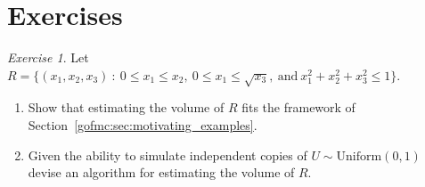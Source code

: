 \documentclass[12pt]{article}
\theoremstyle{plain}
\theoremstyle{definition}
\theoremstyle{remark}
\newtheorem{hw}{Exercise}[section]
\begin{document}
\begin{comment}

The volume of the confidence ellipsoid is given by
$$
\frac{2 \pi^{p/2} k^p}{p \Gamma(p)} \left[ \frac{\det(S)}{m}
\right]^{1/2}\; . 
$$
Then $\det{S}$ is the \textit{generalized variance} of the Monte Carlo
error. While $\det(S)$ is a useful univariate summary it can give an
incomplete picture of the nature of Monte Carlo error.  Recall that
$\det(S)=\lambda_1 \cdots \lambda_p$ so a small generalized variance
can be achieved with one tiny eigenvalue. Thus examination of the
sample eigenvalues is advised in applications.


\subsubsection{Multivariate Stopping Rules}
\label{gofmc:sec:mstop}
The obvious extension of the univariate approach to controlling the width
of a confidence interval is to control the volume of the confidence
ellipsoid which, letting $\det$ denote determinant, is given by
$$
\frac{2 \pi^{p/2} k^p}{p \Gamma(p)} \det(S)^{1/2}\; .
$$
We call $\det{S}$ the \textit{generalized variance} of the Monte Carlo
error. While $\det(S)$ is a useful univariate summary it can give an incomplete
picture of the nature of Monte Carlo error.   Recall that
$\det(S)=\lambda_1  \cdots \lambda_p$ so a small generalized variance
can be achieved with one tiny eigenvalue. Thus examination of the
sample eigenvalues is advised in applications.

Other useful approaches include standardization to adjust for the
marginal variation in the simulation and for the number of quantities
being estimated.  These options are explored in the exercises.
\end{comment}



\section*{Exercises}
\begin{hw}
Let $R = \{(x_1, x_2, x_3) ~:~ 0\le x_1\le x_2, ~0 \le x_1 \le
  \sqrt{x_3},~ \text{and}~ x_1^2 + x_2^2 + x_3^2 \le 1 \}$.
\begin{enumerate}
\item Show that estimating the volume of $R$ fits the framework of
  Section~\ref{gofmc:sec:motivating_examples}.
\item Given the ability to simulate independent copies of $U \sim
  \text{Uniform}(0,1)$ devise an algorithm for estimating the volume
  of $R$.
\end{enumerate}
\end{hw}
\end{document}
